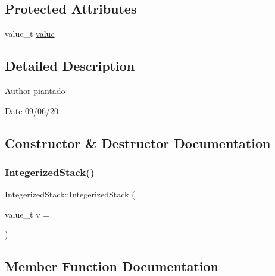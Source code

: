 \subsection*{Protected Attributes}
\begin{DoxyCompactItemize}
\item 
value\+\_\+t \hyperlink{class_integerized_stack_afcfb2d32d51c88b556f3bb7ff2544be5}{value}
\end{DoxyCompactItemize}


\subsection{Detailed Description}
\begin{DoxyAuthor}{Author}
piantado 
\end{DoxyAuthor}
\begin{DoxyDate}{Date}
09/06/20 
\end{DoxyDate}


\subsection{Constructor \& Destructor Documentation}
\mbox{\label{class_integerized_stack_a46b24ace7ea983bfabaa437932111440}} 
\subsubsection{\texorpdfstring{Integerized\+Stack()}{IntegerizedStack()}}
{\footnotesize\ttfamily Integerized\+Stack\+::\+Integerized\+Stack (\begin{DoxyParamCaption}\item[{value\+\_\+t}]{v = {} }\end{DoxyParamCaption})\hspace{0.3cm}{\ttfamily [inline]}}



\subsection{Member Function Documentation}
\mbox{\label{class_integerized_stack_a549d4ed66e89d2e3d7e726d5c8e28fa2}} 
